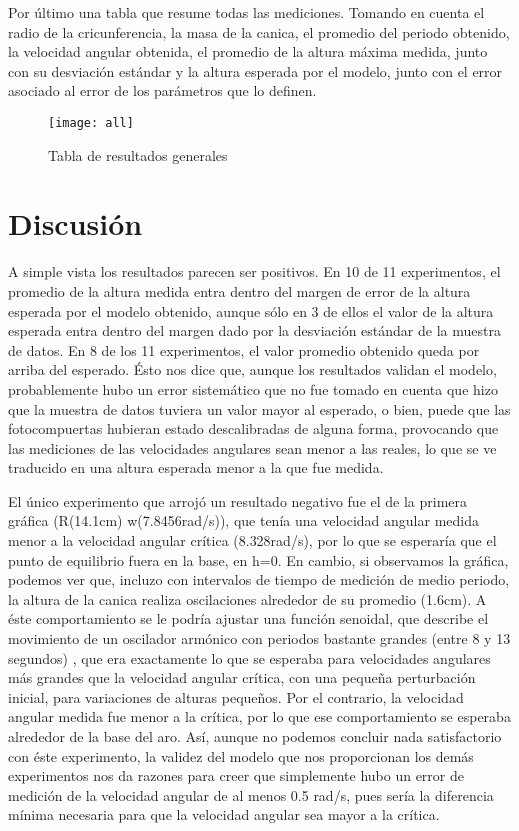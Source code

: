 \documentclass[12p]{article}
\begin{document}
Por último una tabla que resume todas las mediciones. Tomando en cuenta el radio de la cricunferencia, la masa de la canica, el promedio del periodo obtenido, la velocidad angular obtenida, el promedio de la altura máxima medida, junto con su desviación estándar y la altura esperada por el modelo, junto con el error asociado al error de los parámetros que lo definen.

\begin{figure}
	\texttt{[image: all]}
	\caption{Tabla de resultados generales}
\end{figure}

\section{Discusión}

A simple vista los resultados parecen ser positivos. En 10 de 11 experimentos, el promedio de la altura medida entra dentro del margen de error de la altura esperada por el modelo obtenido, aunque sólo en 3 de ellos el valor de la altura esperada entra dentro del margen dado por la desviación estándar de la muestra de datos. En 8 de los 11 experimentos, el valor promedio obtenido queda por arriba del esperado. Ésto nos dice que, aunque los resultados validan el modelo, probablemente hubo un error sistemático que no fue tomado en cuenta que hizo que la muestra de datos tuviera un valor mayor al esperado, o bien, puede que las fotocompuertas hubieran estado descalibradas de alguna forma, provocando que las mediciones de las velocidades angulares sean menor a las reales, lo que se ve traducido en una altura esperada menor a la que fue medida.

El único experimento que arrojó un resultado negativo fue el de la primera gráfica (R(14.1cm) w(7.8456rad/s)), que tenía una velocidad angular medida menor a la velocidad angular crítica (8.328rad/s), por lo que se esperaría que el punto de equilibrio fuera en la base, en h=0. En cambio, si observamos la gráfica, podemos ver que, incluzo con intervalos de tiempo de medición de medio periodo, la altura de la canica realiza oscilaciones alrededor de su promedio (1.6cm). A éste comportamiento se le podría ajustar una función senoidal, que describe el movimiento de un oscilador armónico con periodos bastante grandes (entre 8 y 13 segundos) , que era exactamente lo que se esperaba para velocidades angulares más grandes que la velocidad angular crítica, con una pequeña perturbación inicial, para variaciones de alturas pequeños. Por el contrario, la velocidad angular medida fue menor a la crítica, por lo que ese comportamiento se esperaba alrededor de la base del aro. Así, aunque no podemos concluir nada satisfactorio con éste experimento, la validez del modelo que nos proporcionan los demás experimentos nos da razones para creer que simplemente hubo un error de medición de la velocidad angular de al menos 0.5 rad/s, pues sería la diferencia mínima necesaria para que la velocidad angular sea mayor a la crítica.
\end{document}
